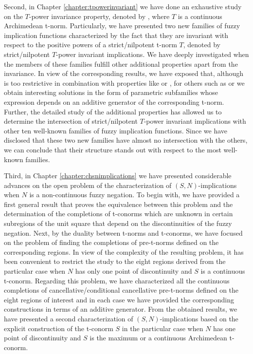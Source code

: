Second, in Chapter \ref{chapter:tpowerinvariant} we have done an exhaustive study on the $T$-power invariance property, denoted by \PIT, where $T$ is a continuous Archimedean t-norm. Particularly, we have presented two new families of fuzzy implication functions characterized by the fact that they are invariant with respect to the positive powers of a strict/nilpotent t-norm $T$, denoted by strict/nilpotent $T$-power invariant implications. We have deeply investigated when the members of these families fulfill other additional properties apart from the invariance. In view of the corresponding results, we have exposed that, although \PIT is too restrictive in combination with properties like \LI or \NP, for others such as \EP or \TC we obtain interesting solutions in the form of parametric subfamilies whose expression depends on an additive generator of the corresponding t-norm. Further, the detailed study of the additional properties has allowed us to determine the intersection of strict/nilpotent $T$-power invariant implications with other ten well-known families of fuzzy implication functions.  Since we have disclosed that these two new families have almost no intersection with the others, we can conclude that their structure stands out with respect to the most well-known families.

Third, in Chapter \ref{chapter:chsnimplications} we have presented considerable advances on the open problem of the characterization of $(S,N)$-implications when $N$ is a non-continuous fuzzy negation. To begin with, we have provided a first general result that proves the equivalence between this problem and the determination of the completions of t-conorms which are unknown in certain subregions of the unit square that depend on the discontinuities of the fuzzy negation. Next, by the duality between t-norms and t-conorms, we have focused on the problem of finding the completions of pre-t-norms defined on the corresponding regions. In view of the complexity of the resulting problem, it has been convenient to restrict the study to the eight regions derived from the particular case when $N$ has only one point of discontinuity and $S$ is a continuous t-conorm. Regarding this problem, we have characterized all the continuous completions of cancellative/conditional cancellative pre-t-norms defined on the eight regions of interest and in each case we have provided the corresponding constructions in terms of an additive generator. From the obtained results, we have presented a second characterization of $(S,N)$-implications based on the explicit construction of the t-conorm $S$ in the particular case when $N$ has one point of discontinuity and $S$ is the maximum or a continuous Archimedean t-conorm.

